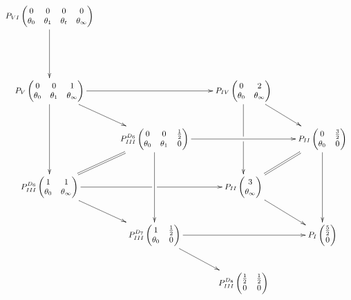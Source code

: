 \documentclass[12]{amsart}
\begin{document}
\begin{equation}\label{eq:DegSchemePainleve}
{\small
 \xymatrix {
 {P_{VI}\begin{pmatrix}0&0&0&0\\ \theta_0&\theta_1&\theta_t&\theta_\infty\end{pmatrix}}\ar[dd]  &&&\\
 &&&\\
  {P_V\begin{pmatrix}0&0&1\\ \theta_0&\theta_1&\theta_\infty\end{pmatrix}} \ar[rr] \ar[dd] \ar[dr] && {P_{IV}\begin{pmatrix}0&2\\ \theta_0&\theta_\infty\end{pmatrix}} \ar[dr] \ar[dd] |!{[dl];[dr]}\hole \\
  & {P_{III}^{D_6}\begin{pmatrix}0&0&\frac{1}{2}\\ \theta_0&\theta_1&0\end{pmatrix}} \ar[rr] \ar[dd] && {P_{II}\begin{pmatrix}0&\frac{3}{2}\\ \theta_0&0\end{pmatrix}} \ar[dd] \\
  {P_{III}^{D_6}\begin{pmatrix}1&1\\ \theta_0&\theta_\infty\end{pmatrix}}\ar@{=}[ur] \ar[rr] |!{[ur];[dr]}\hole \ar[dr] && {P_{II}\begin{pmatrix}3\\ \theta_\infty\end{pmatrix}}\ar@{=}[ur] \ar[rd]& \\
  & {P_{III}^{D_7}\begin{pmatrix}1&\frac{1}{2}\\ \theta_0&0\end{pmatrix}}\ar[dr] \ar[rr] && {P_I\begin{pmatrix}\frac{5}{2}\\ 0\end{pmatrix}} \\ 
    &&{P_{III}^{D_8}\begin{pmatrix}\frac{1}{2}&\frac{1}{2}\\ 0&0\end{pmatrix}}
  }}
\end{equation}
\end{document}
